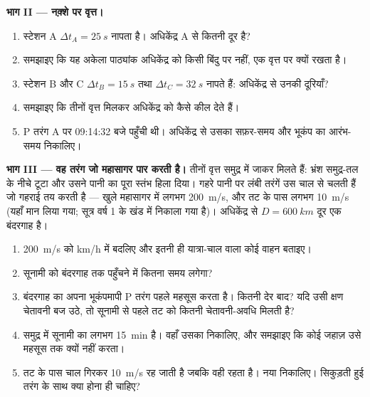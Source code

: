 \begin{problem}
\medskip
\noindent\textbf{भाग II --- नक़्शे पर वृत्त।}
\begin{enumerate}[resume]
  \item स्टेशन A $\Delta t_A = \qty{25}{s}$ नापता है। अधिकेंद्र A से कितनी दूर है?
  \item समझाइए कि यह अकेला पाठ्यांक अधिकेंद्र को किसी बिंदु पर नहीं, एक वृत्त
        पर क्यों रखता है।
  \item स्टेशन B और C $\Delta t_B = \qty{15}{s}$ तथा $\Delta t_C = \qty{32}{s}$ नापते हैं: अधिकेंद्र से उनकी
        दूरियाँ?
  \item समझाइए कि तीनों वृत्त मिलकर अधिकेंद्र को कैसे कील देते हैं।
  \item P तरंग A पर 09:14:32 बजे पहुँची थी। अधिकेंद्र से उसका
        सफ़र-समय और भूकंप का आरंभ-समय निकालिए।
\end{enumerate}

\medskip
\noindent\textbf{भाग III --- वह तरंग जो महासागर पार करती है।}
तीनों वृत्त समुद्र में जाकर मिलते हैं: भ्रंश समुद्र-तल के नीचे टूटा और उसने
पानी का पूरा स्तंभ हिला दिया। गहरे पानी पर लंबी तरंगें उस चाल से
चलती हैं जो गहराई तय करती है --- खुले महासागर में लगभग \qty{200}{m/s}, और तट के
पास लगभग \qty{10}{m/s} (यहाँ मान लिया गया; सूत्र वर्ष 1 के खंड में निकाला गया है)।
अधिकेंद्र से $D = \qty{600}{km}$ दूर एक बंदरगाह है।
\begin{enumerate}[resume]
  \item \qty{200}{m/s} को \unit{km/h} में बदलिए और इतनी ही यात्रा-चाल वाला कोई वाहन
        बताइए।
  \item सूनामी को बंदरगाह तक पहुँचने में कितना समय लगेगा?
  \item बंदरगाह का अपना भूकंपमापी P तरंग पहले महसूस करता है। कितनी
        देर बाद? यदि उसी क्षण चेतावनी बज उठे, तो सूनामी से पहले तट
        को कितनी चेतावनी-अवधि मिलती है?
  \item समुद्र में सूनामी का  लगभग \qty{15}{min} है। वहाँ उसका
         निकालिए, और समझाइए कि कोई जहाज़ उसे महसूस तक
        क्यों नहीं करता।
  \item तट के पास चाल गिरकर \qty{10}{m/s} रह जाती है जबकि  वही
        रहता है। नया  निकालिए। सिकुड़ती हुई तरंग
        के साथ क्या होना ही चाहिए?
\end{enumerate}


\end{problem}
